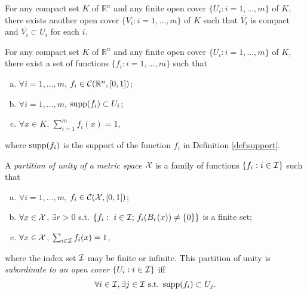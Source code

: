 
\begin{lem}
  \label{lem:sandwichCompactSequence}
  For any compact set $K$ of $\mathbb{R}^n$
  and any finite open cover $\{U_i: i=1, \ldots, m\}$ of $K$, 
  there exists another open cover $\{V_i: i=1, \ldots, m\}$
  of $K$
  such that $\overline{V_i}$ is compact and
  $\overline{V_i}\subset U_i$ for each $i$.
\end{lem}

\begin{thm}
  \label{thm:openCoverForCompactSets}
  For any compact set $K$ of $\mathbb{R}^n$
  and any finite open cover $\{U_i: i=1, \ldots, m\}$ of $K$, 
  there exist a set of functions
  $\{f_i: %
  i=1, \ldots, m\}$
  such that
  \begin{enumerate}[(a)]\itemsep0em
  \item $\forall i=1, \ldots, m$,
    $f_i\in {\cal C}(\mathbb{R}^n, [0,1])$; 
  \item $\forall i=1, \ldots, m$,
    $\mathrm{supp}(f_i)\subset U_i$; 
  \item $\forall x\in K$, $\sum_{i=1}^m f_i(x)=1$, 
  \end{enumerate}
  where $\mathrm{supp}(f_i)$ is the support of the function $f_i$
  in Definition \ref{def:support}.
\end{thm}

\begin{defn}
  \label{defn:partitionOfUnity}
  A \emph{partition of unity of a metric space ${\cal X}$}
  is a family of functions
  $\{f_i: i\in {\cal I}\}$ such that
  \begin{enumerate}[(a)]\itemsep0em
  \item $\forall i=1, \ldots, m$,
    $f_i\in {\cal C}({\cal X}, [0,1])$; 
  \item $\forall x\in {\cal X}$, 
    $\exists r>0$ s.t. 
    $\{f_i:\ i\in {\cal I};\, f_i(B_r(x))\ne \{0\}\}$
    is a finite set;
  \item $\forall x\in {\cal X}$, $\sum_{i\in{\cal I}} f_i(x)=1$, 
  \end{enumerate}
  where the index set ${\cal I}$ may be finite or infinite.
  This partition of unity is \emph{subordinate to an open cover}
  $\{U_i: i\in {\cal I}\}$ iff
  \begin{equation}
    \forall i\in{\cal I}, \exists j \in {\cal I} \text{ s.t. }
    \mathrm{supp}(f_i)\subset U_j. 
  \end{equation}
\end{defn}


